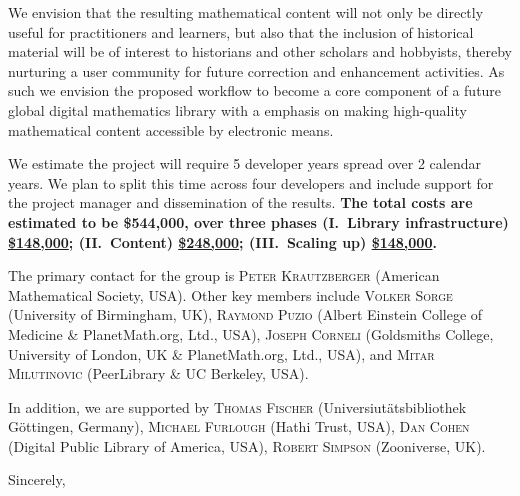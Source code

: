\documentclass[10pt]{article}
\begin{document}
We envision that the resulting mathematical content will not only be
directly useful for practitioners and learners, but also that the
inclusion of historical material will be of interest to historians and
other scholars and hobbyists, thereby nurturing a user community for
future correction and enhancement activities.  As such we envision the
proposed workflow to become a core component of a future global
digital mathematics library with a emphasis on making high-quality
mathematical content accessible by electronic means.

We estimate the project will require 5 developer years spread over 2
calendar years. We plan to split this time across four developers and
include support for the project manager and dissemination of the
results.  \textbf{The total costs are estimated to be \$544,000, over
  three phases (I.~Library infrastructure) \ul{\$148,000};
  (II.~Content) \ul{\$248,000}; (III.~Scaling up) \ul{\$148,000}.}



The primary contact for the group is \textsc{Peter Krautzberger}
(American Mathematical Society, USA).  Other key members include
\textsc{Volker Sorge} (University of Birmingham, UK), \textsc{Raymond
  Puzio} (Albert Einstein College of Medicine \& PlanetMath.org, Ltd.,
USA), \textsc{Joseph Corneli} (Goldsmiths College, University of
London, UK \& PlanetMath.org, Ltd., USA), and \textsc{Mitar
  Milutinovic} (PeerLibrary \& UC Berkeley, USA).

In addition, we are supported by \textsc{Thomas Fischer} (Universiut{\"a}tsbibliothek
G{\"o}ttingen, Germany), \textsc{Michael Furlough} (Hathi Trust, USA), \textsc{Dan Cohen} (Digital Public Library of America, USA), \textsc{Robert Simpson} (Zooniverse, UK).
\begin{flushright}
Sincerely,\\
\quad \\
\quad \\
\quad 
\end{flushright}
\end{document}
